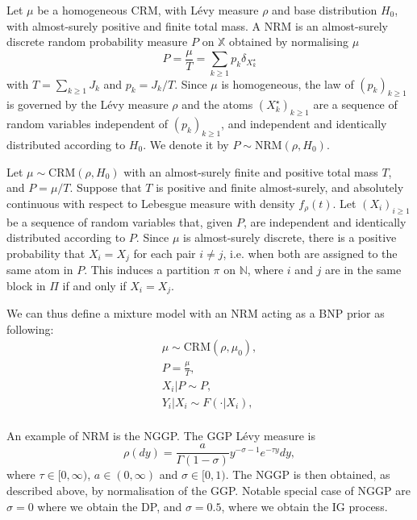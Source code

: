 \begin{definition} \label{def:NRM}
Let $\mu$ be a homogeneous \gls{CRM}, with Lévy measure $\rho$ and base distribution $H_0$, with almost-surely positive and finite total mass. A \gls{NRM} is an almost-surely discrete random probability measure $P$ on $\mathbb{X}$ obtained by normalising $\mu$
$$ P = \frac{\mu}{T} = \sum_{k \ge 1}{p_k \delta_{X^\star_k}} $$
with $T = \sum_{k \ge 1}{J_k}$ and $p_k = J_k / T$.
Since $\mu$ is homogeneous, the law of $\left(p_k \right)_{k \ge 1}$ is governed by the Lévy measure $\rho$ and the atoms $\left(X^\star_k \right)_{k \ge 1}$ are a sequence of random variables independent of $\left(p_k \right)_{k \ge 1}$, and independent and identically distributed according to $H_0$.
We denote it by $P \sim \text{NRM}(\rho, H_0)$. \\
\end{definition}

Let $\mu \sim \text{CRM}(\rho, H_0)$ with an almost-surely finite and positive total mass $T$, and $P = \mu / T$. Suppose that $T$ is positive and finite almost-surely, and absolutely continuous with respect to Lebesgue measure with density $f_\rho(t)$.
Let $(X_i)_{i \ge 1}$ be a sequence of random variables that, given $P$, are independent and identically distributed according to $P$. Since $\mu$ is almost-surely discrete, there is a positive probability that $X_i = X_j$ for each pair $i \neq j$, i.e. when both are assigned to the same atom in $P$. This induces a partition $\pi$ on $\mathbb{N}$, where $i$ and $j$ are in the same block in $\Pi$ if and only if $X_i = X_j$.

We can thus define a mixture model with an \gls{NRM} acting as a \gls{BNP} prior as following:
\begin{gather*}
\mu \sim \text{CRM}(\rho, \mu_0), \\
P = \frac{\mu}{T}, \\
X_i|P \sim P, \\
Y_i|X_i \sim F(\cdot|X_i), \\
\end{gather*}

An example of \gls{NRM} is the \gls{NGGP}. The GGP Lévy measure is
\begin{equation} \label{eq:GGP}
\rho(dy) = \frac{a}{\Gamma(1 - \sigma)}y^{-\sigma-1}e^{-\tau y} dy,
\end{equation}
where $\tau \in [0,\infty)$, $a \in (0, \infty)$ and $\sigma \in [0, 1)$. The \gls{NGGP} is then obtained, as described above, by normalisation of the GGP. Notable special case of \gls{NGGP} are $\sigma = 0$ where we obtain the \gls{DP}, and $\sigma=0.5$, where we obtain the \gls{IG} process.

